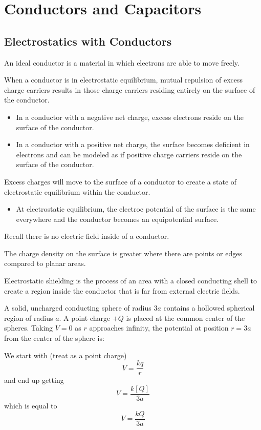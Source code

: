 \documentclass[../em.tex]{subfiles}
\begin{document}
\chapter{Conductors and Capacitors}
\section{Electrostatics with Conductors}
An ideal conductor is a material in which electrons are able to move freely.

When a conductor is in electrostatic equilibrium, mutual repulsion of excess 
charge carriers results in those charge carriers residing entirely on the surface of the conductor.
\begin{itemize}
    \item In a conductor with a negative net charge, excess electrons reside on the surface of the conductor.
    \item In a conductor with a positive net charge, the surface becomes deficient in electrons and can be modeled as if positive charge carriers reside on the surface of the conductor.
\end{itemize}

Excess charges will move to the surface of a conductor to create a state of electrostatic equilibrium within the conductor.
\begin{itemize}
    \item At electrostatic equilibrium, the electroc potential of the surface is the same everywhere and the conductor becomes an equipotential surface.
\end{itemize}

Recall there is no electric field inside of a conductor.

The charge density on the surface is greater where there are points or edges compared to planar areas.

Electrostatic shielding is the process of an area with a closed conducting shell to 
create a region inside the conductor that is far from external electric fields.

\begin{example}
    A solid, uncharged conducting sphere of radius $3a$ contains a hollowed spherical region of radius $a$.
    A point charge $+Q$ is placed at the common center of the spheres. Taking $V = 0$ as $r$ approaches infinity,
    the potential at position $r = 3a$ from the center of the sphere is:

    We start with (treat as a point charge)
    \[V=\frac{kq}{r}\]
    and end up getting 
    \[V=\frac{k[Q]}{3a}\]
    which is equal to 
    \[V=\frac{kQ}{3a}\]  
\end{example}
\end{document}
